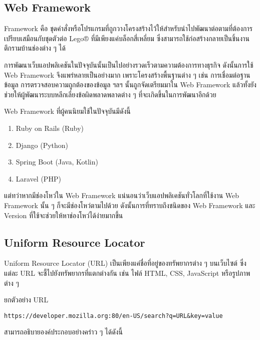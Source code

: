 \subsection{Web Framework}

Framework คือ ชุดคำสั่งหรือโปรแกรมที่ถูกวางโครงสร้างไว้ให้สำหรับนำไปพัฒนาต่อตามที่ต้องการ เปรียบเสมือนกับชุดตัวต่อ Lego® ที่มีเพียงแค่บล็อกสี่เหลี่ยม ซึ่งสามารถใช้ก่อสร้างกลายเป็นชิ้นงานตึกรามบ้านช่องต่าง ๆ ได้

การพัฒนาเว็บแอปพลิเคชันในปัจจุบันนั้นเป็นไปอย่างรวดเร็วตามความต้องการทางธุรกิจ ดังนั้นการใช้ Web Framework  จึงแพร่หลายเป็นอย่างมาก เพราะโครงสร้างพื้นฐานต่าง ๆ เช่น การเชื่อมต่อฐานข้อมูล การตรวจสอบความถูกต้องของข้อมูล ฯลฯ นั้นถูกจัดเตรียมมาใน Web Framework แล้วทั้งยังช่วยให้ผู้พัฒนาระบบหลีกเลี่ยงข้อผิดพลาดพลาดต่าง ๆ ที่จะเกิดขึ้นในการพัฒนาอีกด้วย

Web Framework ที่ผู้คนนิยมใช้ในปัจจุบันมีดังนี้

\begin{enumerate}
	\itemsep0em 
	\item Ruby on Rails (Ruby)
	\item Django (Python)
	\item Spring Boot (Java, Kotlin)
	\item Laravel (PHP)
\end{enumerate}

แต่ทว่าหากมีช่องโหว่ใน Web Framework แน่นอนว่าเว็บแอปพลิเคชันทั่วโลกที่ใช้งาน Web Framework นั้น ๆ ก็จะมีช่องโหว่ตามไปด้วย ดังนั้นการที่ทราบถึงชนิดของ Web Framework และ Version ที่ใช้จะช่วยให้หาช่องโหว่ได้ง่ายมากขึ้น

\subsection{Uniform Resource Locator}

Uniform Resource Locator (URL) เป็นเพียงแค่ชื่อที่อยู่ของทรัพยากรต่าง ๆ บนเว็บไซต์ ซึ่งแต่ละ URL จะชี้ไปยังทรัพยากรที่แตกต่างกัน เช่น ไฟล์ HTML, CSS, JavaScript หรือรูปภาพต่าง ๆ

ยกตัวอย่าง URL

\begin{lstlisting}
https://developer.mozilla.org:80/en-US/search?q=URL&key=value
\end{lstlisting}

สามารถอธิบายองค์ประกอบอย่างคร่าว ๆ ได้ดังนี้

